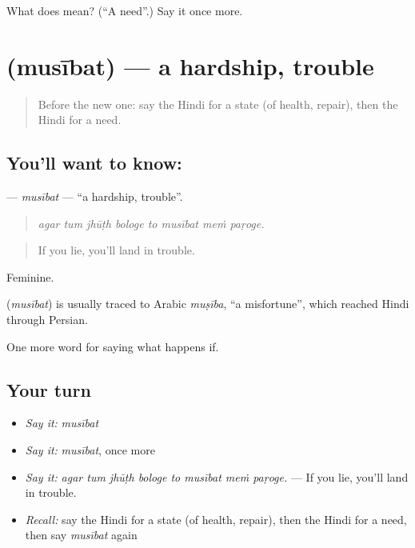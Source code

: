 \begin{tcolorbox}[breakable,colback=teal!4,colframe=teal!35!black,title={Before you move on}]
What does  mean? (\textquotedblleft{}A need\textquotedblright{}.) Say it once more.
\end{tcolorbox}
\section[\texorpdfstring{\hi{मुसीबत} (musībat)}{मुसीबत (musībat)}]{ (musībat) — a hardship, trouble}

\label{lesson:HI-C377-musibat}



\begin{quote}
Before the new one: say the Hindi for a state (of health, repair), then the Hindi for a need.
\end{quote}

\subsection*{You'll want to know: }
\textbf{} — \emph{musībat} — \textquotedblleft{}a hardship, trouble\textquotedblright{}.

\begin{quote}
       
\end{quote}

\begin{quote}
\emph{agar tum jhūṭh bologe to musībat meṁ paṛoge.}
\end{quote}

\begin{quote}
If you lie, you'll land in trouble.
\end{quote}

Feminine.

\begin{cousinweb}
\textbf{} (\emph{musībat}) is usually traced to Arabic \emph{muṣība}, \textquotedblleft{}a misfortune\textquotedblright{}, which reached Hindi through Persian.
\end{cousinweb}

\begin{grammarlens}[title={What you've built}]
One more word for saying what happens if.
\end{grammarlens}

\subsection*{Your turn}
\begin{itemize}
\raggedright
  \item \emph{Say it:} \emph{musībat}
  \item \emph{Say it:} \emph{musībat}, once more
  \item \emph{Say it:} \emph{agar tum jhūṭh bologe to musībat meṁ paṛoge.} — If you lie, you'll land in trouble.
  \item \emph{Recall:} say the Hindi for a state (of health, repair), then the Hindi for a need, then say \emph{musībat} again
\end{itemize}

